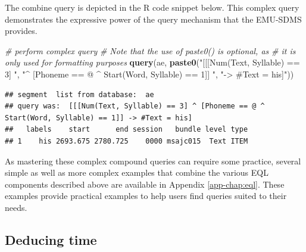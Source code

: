 \documentclass[]{book}
\newenvironment{Shaded}{\begin{snugshade}}{\end{snugshade}}
\newcommand{\CommentTok}[1]{\textcolor[rgb]{0.56,0.35,0.01}{\textit{#1}}}
\newcommand{\KeywordTok}[1]{\textcolor[rgb]{0.13,0.29,0.53}{\textbf{#1}}}
\newcommand{\NormalTok}[1]{#1}
\newcommand{\StringTok}[1]{\textcolor[rgb]{0.31,0.60,0.02}{#1}}
\theoremstyle{definition}
\theoremstyle{definition}
\theoremstyle{definition}
\theoremstyle{remark}
\begin{document}
The combine query is depicted in the R code snippet below. This complex
query demonstrates the expressive power of the query mechanism that the
EMU-SDMS provides.

\begin{Shaded}
\begin{Highlighting}[]
\CommentTok{# perform complex query}
\CommentTok{# Note that the use of paste0() is optional, as}
\CommentTok{# it is only used for formatting purposes}
\KeywordTok{query}\NormalTok{(ae, }\KeywordTok{paste0}\NormalTok{(}\StringTok{"[[[Num(Text, Syllable) == 3] "}\NormalTok{,}
                 \StringTok{"^ [Phoneme == @ ^ Start(Word, Syllable) == 1]] "}\NormalTok{,}
                 \StringTok{"-> #Text = his]"}\NormalTok{))}
\end{Highlighting}
\end{Shaded}

\begin{verbatim}
## segment  list from database:  ae 
## query was:  [[[Num(Text, Syllable) == 3] ^ [Phoneme == @ ^ Start(Word, Syllable) == 1]] -> #Text = his] 
##   labels    start      end session   bundle level type
## 1    his 2693.675 2780.725    0000 msajc015  Text ITEM
\end{verbatim}

As mastering these complex compound queries can require some practice,
several simple as well as more complex examples that combine the various
EQL components described above are available in Appendix
\ref{app-chap:eql}. These examples provide practical examples to help
users find queries suited to their needs.

\hypertarget{subsec:query_deducingTime}{%
\subsection{Deducing time}\label{subsec:query_deducingTime}}
\end{document}
